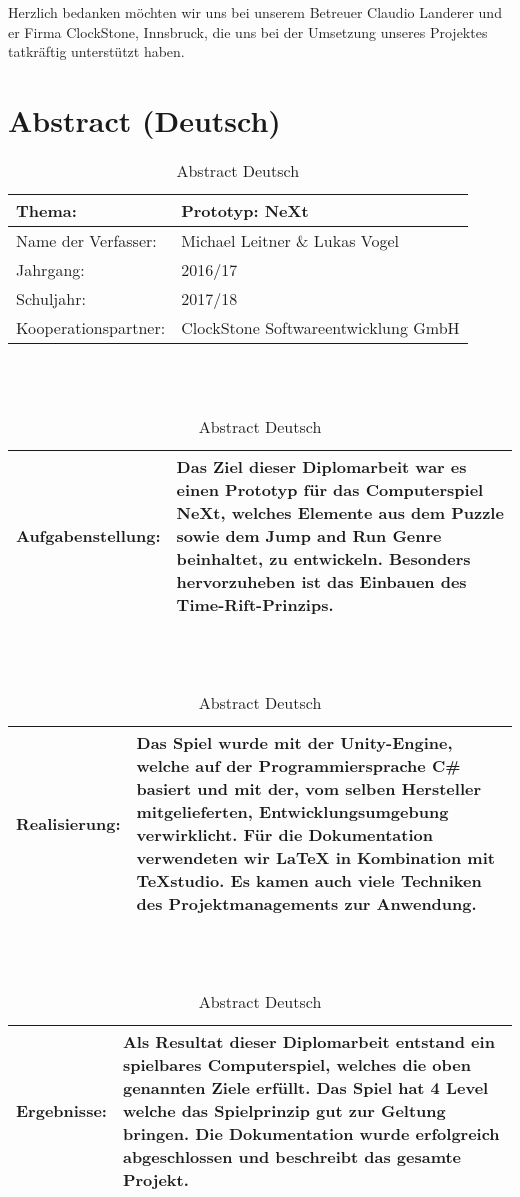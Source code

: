 Herzlich bedanken möchten wir uns bei unserem Betreuer Claudio Landerer und er Firma ClockStone, Innsbruck, die uns bei der Umsetzung unseres Projektes tatkräftig unterstützt haben. 
\chapter*{Abstract (Deutsch)}
\def \currentAuthor {Lukas Vogel}
\begin{table}[H]
	
	\renewcommand{\arraystretch}{1.5}
\begin{tabular}{|p{4cm}|p{10cm}|}
	\hline 
	Thema: &  Prototyp: NeXt\\ 
	\hline
	 Name der Verfasser: & Michael Leitner \& Lukas Vogel  \\ 
	\hline 
	Jahrgang: & 2016/17 \\
	\hline
	 Schuljahr: & 2017/18 \\
	\hline 
	Kooperationspartner: & ClockStone Softwareentwicklung GmbH\\
	\hline
\end{tabular}
\ \\
\ \\
\begin{tabular}{|p{4cm}|p{10cm}|}
	\hline
	Aufgabenstellung: & Das Ziel dieser Diplomarbeit war es einen Prototyp für das Computerspiel NeXt, welches Elemente aus dem Puzzle sowie dem Jump and Run Genre beinhaltet, zu entwickeln. Besonders hervorzuheben ist das Einbauen des Time-Rift-Prinzips. \\
	\hline
\end{tabular} 
\ \\
\ \\
\begin{tabular}{|p{4cm}|p{10cm}|}
	\hline
	Realisierung: & Das Spiel wurde mit der Unity-Engine, welche auf der
	Programmiersprache C\# basiert und mit der, vom selben Hersteller mitgelieferten, Entwicklungsumgebung verwirklicht. Für die Dokumentation verwendeten wir LaTeX in Kombination mit TeXstudio. Es kamen auch viele Techniken des Projektmanagements zur Anwendung.\\
	\hline
\end{tabular}
\ \\
\ \\
\begin{tabular}{|p{4cm}|p{10cm}|}
	\hline
	Ergebnisse: & Als Resultat dieser Diplomarbeit entstand ein spielbares Computerspiel, welches die oben genannten Ziele erfüllt. Das Spiel hat 4 Level welche das Spielprinzip gut zur Geltung bringen. Die Dokumentation wurde erfolgreich abgeschlossen und beschreibt das gesamte Projekt. \\
	\hline
\end{tabular}
\caption{Abstract Deutsch}
\end{table}
